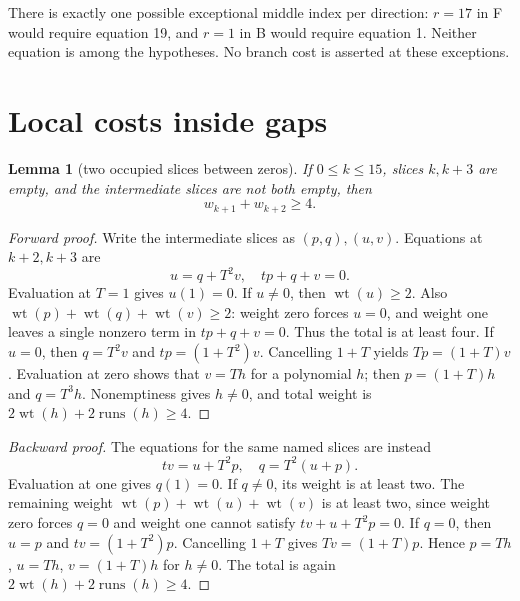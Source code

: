 \documentclass{article}
\newtheorem{lemma}{Lemma}
\DeclareMathOperator{\wt}{wt}
\DeclareMathOperator{\runs}{runs}
\begin{document}
There is exactly one possible exceptional middle index per direction:
\(r=17\) in F would require equation 19, and \(r=1\) in B would require
equation 1. Neither equation is among the hypotheses. No branch cost is
asserted at these exceptions.

\section{Local costs inside gaps}\label{sec:gaps}

\begin{lemma}[two occupied slices between zeros]\label{lem:two}
  If \(0\le k\le 15\), slices \(k,k+3\) are empty, and the intermediate slices
  are not both empty, then
  \begin{equation}
    w_{k+1}+w_{k+2}\ge 4.
  \end{equation}
\end{lemma}

\begin{proof}[Forward proof]
%
  Write the intermediate slices as \((p,q),(u,v)\).
  Equations at \(k+2,k+3\) are
  \begin{equation}
    u=q+T^2v, \quad tp+q+v=0.
  \end{equation}
  Evaluation at \(T=1\) gives \(u(1)=0\). If \(u\ne 0\), then \(\wt(u)\ge 2\).
  Also \(\wt(p)+\wt(q)+\wt(v)\ge 2\): weight zero forces \(u=0\), and weight one
  leaves a single nonzero term in \(tp+q+v=0\). Thus the total is at least four.
  If \(u=0\), then \(q=T^2v\) and \(tp=(1+T^2)v\). Cancelling \(1+T\) yields
  \(Tp=(1+T)v\). Evaluation at zero shows that \(v=Th\) for a polynomial \(h\);
  then \(p=(1+T)h\) and \(q=T^3h\). Nonemptiness gives \(h\ne 0\), and total
  weight is \(2\wt(h)+2\runs(h)\ge 4\).
\end{proof}

\begin{proof}[Backward proof]
  The equations for the same named slices are instead
  \begin{equation}
    tv=u+T^2p, \quad q=T^2(u+p).
  \end{equation}
  Evaluation at one gives \(q(1)=0\). If \(q\ne 0\), its weight is at least two.
  The remaining weight \(\wt(p)+\wt(u)+\wt(v)\) is at least two, since weight
  zero forces \(q=0\) and weight one cannot satisfy \(tv+u+T^2p=0\).
  If \(q=0\), then \(u=p\) and \(tv=(1+T^2)p\). Cancelling \(1+T\) gives
  \(Tv=(1+T)p\). Hence \(p=Th\), \(u=Th\), \(v=(1+T)h\) for \(h\ne 0\).
  The total is again \(2\wt(h)+2\runs(h)\ge 4\).
\end{proof}
\end{document}
